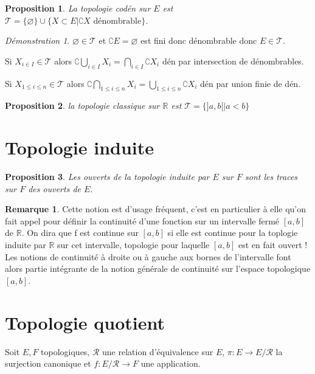\documentclass[a4paper, 11pt, french]{book}
\newenvironment{itemise}{\itemize}{\enditemize}
\theoremstyle{plain} %
\newtheorem{proposition}{Proposition}
\theoremstyle{definition} %
\newtheorem{remarque}{Remarque}
\theoremstyle{remark} %
\newtheorem*{demonstration}{Démonstration}
\newcommand{\1}{\mathds{1}}
\newcommand\vide{\varnothing}
\newcommand{\infegal}{\leqslant}
\newcommand{\R}{\mathbb{R}}
\begin{document}
\begin{proposition}
	La topologie codén sur $E$ est $\mathscr{T}=\{\vide\}\cup\{X\subset E|\complement X\text{ dénombrable}\}$.
\end{proposition}

\begin{demonstration}
	\begin{itemise}
		\item $\vide\in\mathscr{T}$ et $\complement E=\vide$ est fini donc dénombrable donc $E\in\mathscr{T}$.
		\item Si $X_{i\in I}\in\mathscr{T}$ alors $\complement\bigcup_{i\in I}X_i=\bigcap_{i\in I}\complement X_i$ dén par intersection de dénombrables.
		\item Si $X_{1\infegal i\infegal n}\in\mathscr{T}$ alors $\complement\bigcap_{1\infegal i\infegal n}X_i=\bigcup_{1\infegal i\infegal n}\complement X_i$ dén par union finie de dén.
	\end{itemise}
\end{demonstration}

\begin{proposition}
	la topologie classique sur $\R$ est $\mathscr{T}=\{]a, b[|a<b\}$
\end{proposition}

\section{Topologie induite}

\begin{proposition}
	Les ouverts de la topologie induite par $E$ sur $F$ sont les traces sur $F$ des ouverts de $E$.
\end{proposition}

\begin{remarque}
	Cette notion est d’usage fréquent, c’est en particulier à elle qu’on fait appel pour définir la continuité d’une fonction sur un intervalle fermé $[a, b]$ de $\R$.
	On dira que f est continue sur $[a, b]$ si elle est continue pour la toplogie induite par $\R$ sur cet intervalle, topologie pour laquelle $[a, b]$ est en fait ouvert !
	Les notions de continuité à droite ou à gauche aux bornes de l’intervalle font alors partie intégrante de la notion générale de continuité sur l’espace topologique $[a, b]$.
\end{remarque}

\section{Topologie quotient}
Soit $E, F$ topologiques, $\mathcal{R}$ une relation d’équivalence sur $E$, $\pi\colon E\rightarrow E/\mathcal{R}$ la surjection canonique et $f\colon E/\mathcal{R}\rightarrow F$ une application.
\end{document}
